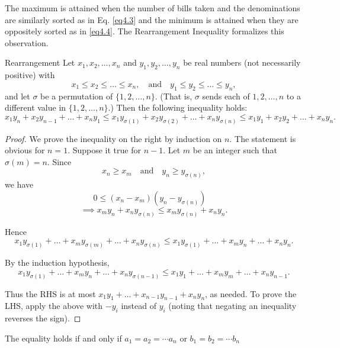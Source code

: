 \documentclass[
	12pt, %
	fleqn, %
	a4paper, %
]{LegrandOrangeBook}
\begin{document}
The maximum is attained when the number of bills taken and the denominations are similarly sorted as
 in Eq. \ref{eq4.3} and the minimum is attained when they are oppositely sorted as in \ref{eq4.4}. The Rearrangement Inequality formalizes this observation.
\begin{theorem}{Rearrangement}
    Let \( x_1, x_2, \ldots, x_n \) and \( y_1, y_2, \ldots, y_n \) be real numbers (not necessarily positive) with
\[ x_1 \leq x_2 \leq \ldots \leq x_n, \quad \text{and} \quad y_1 \leq y_2 \leq \ldots \leq y_n, \]
and let \( \sigma \) be a permutation of \( \{1, 2, \ldots, n\} \). (That is, \( \sigma \) sends each of \( 1, 2, \ldots, n \) to a different value in \( \{1, 2, \ldots, n\} \).) Then the following inequality holds:
\[ x_1y_n + x_2y_{n-1} + \ldots + x_ny_1 \leq x_1y_{\sigma(1)} + x_2y_{\sigma(2)} + \ldots + x_ny_{\sigma(n)} \leq x_1y_1 + x_2y_2 + \ldots + x_ny_n. \]
\end{theorem}
\begin{proof}
    We prove the inequality on the right by induction on \( n \). The statement is obvious for \( n = 1 \). Suppose it true for \( n - 1 \). Let \( m \) be an integer such that \( \sigma(m) = n \). Since
\[ x_n \geq x_m \quad \text{and} \quad y_n \geq y_{\sigma(n)}, \]
we have
\[ 0 \leq (x_n - x_m)(y_n - y_{\sigma(n)}) \quad \]
\[\implies x_my_n + x_ny_{\sigma(n)} \leq x_my_{\sigma(n)} + x_ny_n. \]

Hence
\[ x_1y_{\sigma(1)} + \ldots + x_my_{\sigma(m)} + \ldots + x_ny_{\sigma(n)} \leq x_1y_{\sigma(1)} + \ldots + x_my_n + \ldots + x_ny_n. \]

By the induction hypothesis,
\[ x_1y_{\sigma(1)} + \ldots + x_my_n + \ldots + x_ny_{\sigma(n-1)} \leq x_1y_1 + \ldots + x_my_m + \ldots + x_ny_{n-1}. \]

Thus the RHS is at most \( x_1y_1 + \ldots + x_{n-1}y_{n-1} + x_ny_n \), as needed.
To prove the LHS, apply the above with \( -y_i \) instead of \( y_i \) (noting that negating an inequality reverses the sign).
\end{proof}
\begin{remark}
    The equality holds if and only if $a_1 = a_2 =\cdots a_n$ or $b_1 = b_2 =\cdots b_n$
\end{remark}
\end{document}
